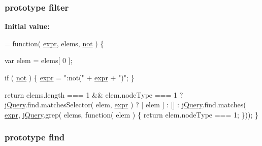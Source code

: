 \subsubsection[{filter}]{ {\bf prototype} filter}\label{jquery-1_810_82-vsdoc_8js_ac99d0cf56cab46114f5765a14e03ad6d}
{\bfseries Initial value\+:}
\begin{DoxyCode}
= \textcolor{keyword}{function}( \hyperlink{jquery-1_810_82-vsdoc_8js_aaacd1d5b3593ba4dfff6d67d4f6cfda1}{expr}, elems, \hyperlink{jquery-1_810_82-vsdoc_8js_a78ab1ea877c73295e1e4cd1002ad38c7}{not} ) \{

        var elem = elems[ 0 ];

        \textcolor{keywordflow}{if} ( \hyperlink{jquery-1_810_82-vsdoc_8js_a78ab1ea877c73295e1e4cd1002ad38c7}{not} ) \{
            \hyperlink{jquery-1_810_82-vsdoc_8js_aaacd1d5b3593ba4dfff6d67d4f6cfda1}{expr} = \textcolor{stringliteral}{":not("} + \hyperlink{jquery-1_810_82-vsdoc_8js_aaacd1d5b3593ba4dfff6d67d4f6cfda1}{expr} + \textcolor{stringliteral}{")"};
        \}

        \textcolor{keywordflow}{return} elems.length === 1 && elem.nodeType === 1 ?
            \hyperlink{jquery-1_810_82-vsdoc_8js_add5237586d970a38a81f990e8eb28c6c}{jQuery}.find.matchesSelector( elem, \hyperlink{jquery-1_810_82-vsdoc_8js_aaacd1d5b3593ba4dfff6d67d4f6cfda1}{expr} ) ? [ elem ] : [] :
            \hyperlink{jquery-1_810_82-vsdoc_8js_add5237586d970a38a81f990e8eb28c6c}{jQuery}.find.matches( \hyperlink{jquery-1_810_82-vsdoc_8js_aaacd1d5b3593ba4dfff6d67d4f6cfda1}{expr}, \hyperlink{jquery-1_810_82-vsdoc_8js_add5237586d970a38a81f990e8eb28c6c}{jQuery}.grep( elems, \textcolor{keyword}{function}( elem ) \{
                return elem.nodeType === 1;
            \}));
    \}
\end{DoxyCode}
\hypertarget{jquery-1_810_82-vsdoc_8js_a7fc0ed1bd74e970d443775bdab4706f4}{}
\subsubsection[{find}]{ {\bf prototype} find}\label{jquery-1_810_82-vsdoc_8js_a7fc0ed1bd74e970d443775bdab4706f4}
\hypertarget{jquery-1_810_82-vsdoc_8js_a8a08d47f51f8dd32803538f46edb3e92}{}
